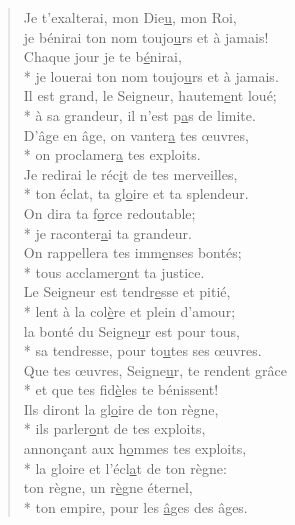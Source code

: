 
\begin{verse}
Je t’exalterai, mon Die\underline{u}, mon Roi, \\
je bénirai ton nom toujo\underline{u}rs et à jamais! \\

Chaque jour je te b\underline{é}nirai, \\*
je louerai ton nom toujo\underline{u}rs et à jamais. \\
Il est grand, le Seigneur, hautem\underline{e}nt loué; \\*
à sa grandeur, il n’est p\underline{a}s de limite. \\

D’âge en âge, on vanter\underline{a} tes œuvres, \\*
on proclamer\underline{a} tes exploits. \\
Je redirai le réc\underline{i}t de tes merveilles, \\*
ton éclat, ta gl\underline{o}ire et ta splendeur. \\

On dira ta f\underline{o}rce redoutable; \\*
je raconter\underline{a}i ta grandeur. \\
On rappellera tes imm\underline{e}nses bontés; \\*
tous acclamer\underline{o}nt ta justice. \\

Le Seigneur est tendr\underline{e}sse et pitié, \\*
lent à la col\underline{è}re et plein d’amour; \\
la bonté du Seigne\underline{u}r est pour tous, \\*
sa tendresse, pour to\underline{u}tes ses œuvres. \\

Que tes œuvres, Seigne\underline{u}r, te rendent grâce \\*
et que tes fid\underline{è}les te bénissent! \\
Ils diront la gl\underline{o}ire de ton règne, \\*
ils parler\underline{o}nt de tes exploits, \\

annonçant aux h\underline{o}mmes tes exploits, \\*
la gloire et l’écl\underline{a}t de ton règne: \\
ton règne, un r\underline{è}gne éternel, \\*
ton empire, pour les \underline{â}ges des âges. \\


\end{verse}
